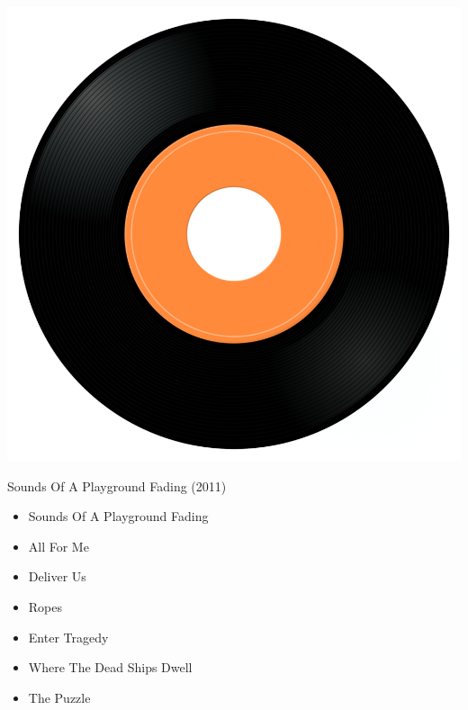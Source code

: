 \begin{minipage}[t]{0.25\textwidth}\vspace{0pt}
\captionsetup{type=figure}
\includegraphics[width=\textwidth]{Images/cover.png}
\caption*{Sounds Of A Playground Fading (2011)}
\end{minipage}
\begin{minipage}[t]{0.25\textwidth}\vspace{0pt}
\begin{itemize}[nosep,leftmargin=1em,labelwidth=*,align=left]
	\setlength{\itemsep}{0pt}
	\item Sounds Of A Playground Fading
	\item All For Me
	\item Deliver Us
	\item Ropes
	\item Enter Tragedy
	\item Where The Dead Ships Dwell
	\item The Puzzle
\end{itemize}
\end{minipage}
